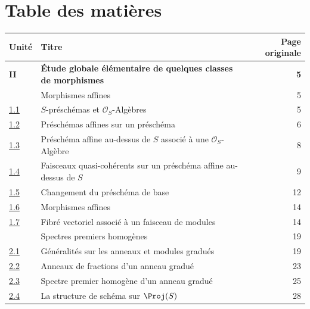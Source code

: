
\endgroup

\clearpage
{}
\thispagestyle{empty}
\mbox{}

\clearpage
{}
{}
\section*{Table des matières}
\thispagestyle{plain}

\begingroup
\small
\renewcommand{\arraystretch}{1.04}
\begin{longtable}{@{}p{}p{}r@{}}
\textbf{Unité} & \textbf{Titre} & \textbf{Page originale}\\
\hline
\textbf{II} & \textbf{Étude globale élémentaire de quelques classes de morphismes} & \textbf{5}\\
\hyperref[section:II.1-fr]{\textsection1} & Morphismes affines & 5\\
\hyperref[subsection:II.1.1-fr]{1.1} & $S$-préschémas et $\mathcal{O}_S$-Algèbres & 5\\
\hyperref[subsection:II.1.2-fr]{1.2} & Préschémas affines sur un préschéma & 6\\
\hyperref[subsection:II.1.3-fr]{1.3} & Préschéma affine au-dessus de $S$ associé à une $\mathcal{O}_S$-Algèbre & 8\\
\hyperref[subsection:II.1.4-fr]{1.4} & Faisceaux quasi-cohérents sur un préschéma affine au-dessus de $S$ & 9\\
\hyperref[II.1.5-fr]{1.5} & Changement du préschéma de base & 12\\
\hyperref[II.1.6-fr]{1.6} & Morphismes affines & 14\\
\hyperref[II.1.7-fr]{1.7} & Fibré vectoriel associé à un faisceau de modules & 14\\
\hyperref[section:II.2-fr]{\textsection2} & Spectres premiers homogènes & 19\\
\hyperref[subsection:II.2.1-fr]{2.1} & Généralités sur les anneaux et modules gradués & 19\\
\hyperref[subsection:II.2.2-fr]{2.2} & Anneaux de fractions d'un anneau gradué & 23\\
\hyperref[subsection:II.2.3-fr]{2.3} & Spectre premier homogène d'un anneau gradué & 25\\
\hyperref[subsection:II.2.4-fr]{2.4} & La structure de schéma sur $\Proj(S)$ & 28\\

\end{longtable}
